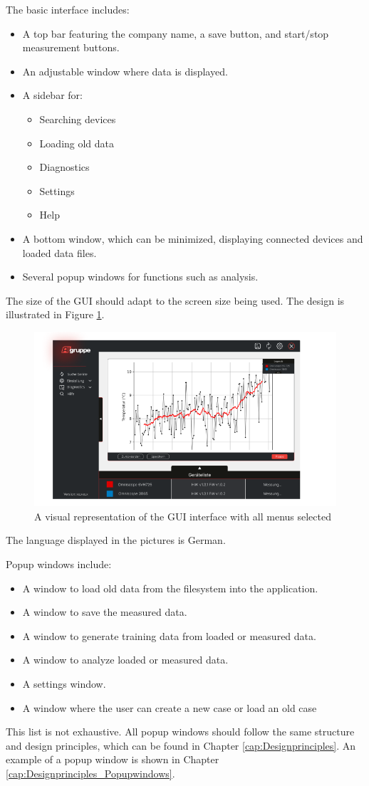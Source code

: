 \documentclass[]{scrreprt}
\begin{document}
The basic interface includes:
\begin{itemize}
\item A top bar featuring the company name, a save button, and start/stop measurement buttons.
\item An adjustable window where data is displayed.
\item A sidebar for:
    \begin{itemize}
    \item Searching devices
    \item Loading old data
    \item Diagnostics
    \item Settings
    \item Help
    \end{itemize}
\item A bottom window, which can be minimized, displaying connected devices and loaded data files.
\item Several popup windows for functions such as analysis.
\end{itemize}

The size of the GUI should adapt to the screen size being used. The design is illustrated in Figure \ref{fig:GUI}.

\begin{figure}[!h]
\includegraphics[width=.9\textwidth]{./assets/pictures/DatawindowVersion1.0.png}
\caption[]{A visual representation of the GUI interface with all menus selected}
\label{fig:GUI}
\end{figure}

The language displayed in the pictures is German.

Popup windows include:
\begin{itemize}
\item A window to load old data from the filesystem into the application.
\item A window to save the measured data.
\item A window to generate training data from loaded or measured data.
\item A window to analyze loaded or measured data.
\item A settings window.
\item A window where the user can create a new case or load an old case 
\end{itemize}
This list is not exhaustive.
 All popup windows should follow the same structure and design principles, which can be found in Chapter \ref{cap:Designprinciples}. 
 An example of a popup window is shown in Chapter \ref{cap:Designprinciples_Popupwindows}.
\end{document}
